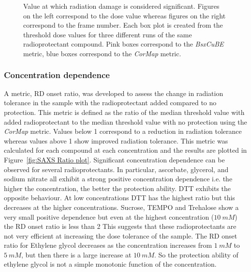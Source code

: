 \begin{figure}
\begin{subfigure}[b]{0.45\textwidth}
            \caption{}
            \label{fig:SAXS frame- 10mM}
    \end{subfigure}
    \caption{Value at which radiation damage is considered significant. Figures on the left correspond to the dose value whereas figures on the right correspond to the frame number. Each box plot is created from the threshold dose values for three different runs of the same radioprotectant compound. Pink boxes correspond to the \textit{BsxCuBE} metric, blue boxes correspond to the \textit{CorMap} metric.}
    \label{fig:SAXS dose vs frame}
\end{figure}

\subsubsection{Concentration dependence}
\label{subs:Concentration dependence}
A metric, RD onset ratio, was developed to assess the change in radiation tolerance in the sample with the radioprotectant added compared to no protection.
This metric is defined as the ratio of the median threshold value with added radioprotectant to the median threshold value with no protection using the \textit{CorMap} metric.
Values below 1 correspond to a reduction in radiation tolerance whereas values above 1 show improved radiation tolerance.
This metric was calculated for each compound at each concentration and the results are plotted in Figure~\ref{fig:SAXS Ratio plot}.
Significant concentration dependence can be observed for several radioprotectants.
In particular, ascorbate, glycerol, and sodium nitrate all exhibit a strong positive concentration dependence i.e. the higher the concentration, the better the protection ability.
DTT exhibits the opposite behaviour.
At low concentrations DTT has the highest ratio but this decreases at the higher concentrations.
Sucrose, TEMPO and Trehalose show a very small positive dependence but even at the highest concentration ($10\ mM$) the RD onset ratio is less than 2
This suggests that these radioprotectants are not very efficient at increasing the dose tolerance of the sample.
The RD onset ratio for Ethylene glycol decreases as the concentration increases from $1\ mM$ to $5\ mM$, but then there is a large increase at $10\ mM$.
So the protection ability of ethylene glycol is not a simple monotonic function of the concentration.
